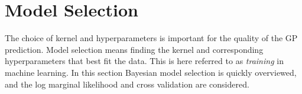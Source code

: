 \documentclass[twoside,english]{uiofysmaster}
\begin{document}
\section{Model Selection}

The choice of kernel and hyperparameters is important for the quality of the GP prediction. Model selection means finding the  kernel and corresponding hyperparameters that best fit the data. This is here referred to as \textit{training} in machine learning. In this section Bayesian model selection is quickly overviewed, and the log marginal likelihood and cross validation are considered.

\end{document}
